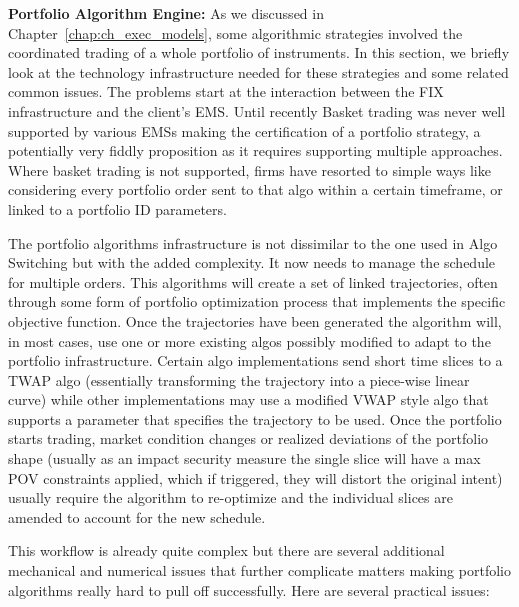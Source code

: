 \noindent\textbf{Portfolio Algorithm Engine:} As we discussed in Chapter~\ref{chap:ch_exec_models}, some algorithmic strategies involved the coordinated trading of a whole portfolio of instruments. In this section, we briefly look at the technology infrastructure needed for these strategies and some related common issues. The problems start at the interaction between the FIX infrastructure and the client's EMS. Until recently Basket trading was never well supported by various EMSs making the certification of a portfolio strategy, a potentially very fiddly proposition as it requires supporting multiple approaches. Where basket trading is not supported, firms have resorted to simple ways like considering every portfolio order sent to that algo within a certain timeframe, or linked to a portfolio ID parameters.


The portfolio algorithms infrastructure is not dissimilar to the one used in Algo Switching but with the added complexity. It now needs to manage the schedule for multiple orders. This algorithms will create a set of linked trajectories, often through some form of portfolio optimization process that implements the specific objective function. Once the trajectories have been generated the algorithm will, in most cases, use one or more existing  algos possibly modified to adapt to the portfolio infrastructure.  Certain algo implementations send short time slices to a TWAP algo (essentially transforming the trajectory into a piece-wise linear curve) while other implementations may use a modified VWAP style algo that supports a parameter that specifies the trajectory to be used. Once the portfolio starts trading, market condition changes or realized deviations of the portfolio shape (usually as an impact security measure the single slice will have a max POV constraints applied, which if triggered, they will distort the original intent) usually require the algorithm to re-optimize and the individual slices are amended to account for the new schedule.


This workflow is already quite complex but there are several additional mechanical and numerical issues that further complicate matters making portfolio algorithms really hard to pull off successfully. Here are several practical issues:

